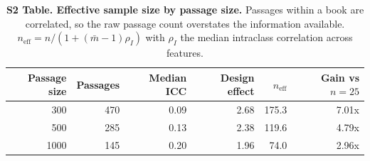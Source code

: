 \begin{table}[!ht]
\centering
\footnotesize
\caption{{\bf S2 Table. Effective sample size by passage size.}  Passages within a book are correlated, so the raw passage count overstates the information available.  $n_{\mathrm{eff}} = n/(1+(\bar m -1)\rho_I)$ with $\rho_I$ the median intraclass correlation across features.}
\label{tab:s2}
\begin{tabular}{rrrrrr}
\toprule
\textbf{Passage size} & \textbf{Passages} & \textbf{Median ICC} & \textbf{Design effect} & \textbf{$n_{\mathrm{eff}}$} & \textbf{Gain vs $n=25$} \\
\midrule
300 & 470 & 0.09 & 2.68 & 175.3 & 7.01x \\
500 & 285 & 0.13 & 2.38 & 119.6 & 4.79x \\
1000 & 145 & 0.20 & 1.96 & 74.0 & 2.96x \\
\bottomrule
\end{tabular}
\end{table}
